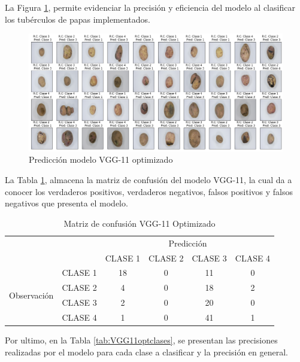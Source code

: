 La Figura \ref{fig:pre_vgg11_opt}, permite evidenciar la precisión y eficiencia del modelo al clasificar los tubérculos de papas implementados. 	
\begin{figure}[ht]
	\centering
	\includegraphics[scale=0.4]{Figs/510.png}
	\caption{Predicción modelo VGG-11 optimizado}
	\label{fig:pre_vgg11_opt}
\end{figure}

\newpage
La Tabla \ref{tab:MC_VGG11_OPT}, almacena la matriz de confusión del modelo VGG-11, la cual da a conocer los verdaderos positivos, verdaderos negativos, falsos positivos y falsos negativos que presenta el modelo.
\begin{table}[htbp]
	\centering
	\begin{tabular}{|c|l|c|c|c|c|}
		\hline
		\multicolumn{2}{|c|}{\multirow{2}[4]{*}{}} & \multicolumn{4}{c|}{Predicción} \bigstrut\\
		\cline{3-6}    \multicolumn{2}{|c|}{} & CLASE 1 & CLASE 2 & CLASE 3 & CLASE 4 \bigstrut\\
		\hline
		\multirow{4}[8]{*}{\begin{sideways}Observación\end{sideways}} & CLASE 1 & 18     & 0     & 11    & 0 \bigstrut\\
		\cline{2-6}          & CLASE 2 & 4     & 0     & 18    & 2 \bigstrut\\
		\cline{2-6}          & CLASE 3 & 2     & 0     & 20    & 0 \bigstrut\\
		\cline{2-6}          & CLASE 4 & 1     & 0     & 41    & 1 \bigstrut\\
		\hline
	\end{tabular}%
	\caption{Matriz de confusión VGG-11 Optimizado }
	\label{tab:MC_VGG11_OPT}%
\end{table}%

Por ultimo, en la Tabla \ref{tab:VGG11optclases}, se presentan las precisiones realizadas por el modelo para cada clase a clasificar y la precisión en general.

